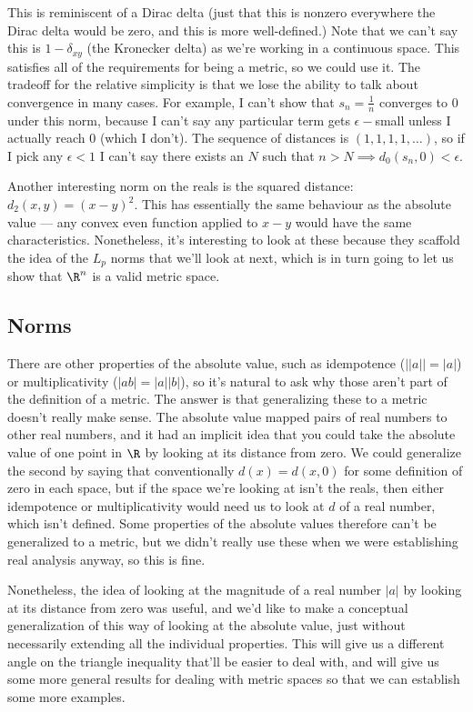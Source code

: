 \documentclass[./analysis.tex]{subfiles}
\begin{document}
    This is reminiscent of a Dirac delta (just that this is nonzero everywhere the Dirac delta would be zero, and this is more well-defined.) Note that we can't say this is $1 - \delta_{xy}$ (the Kronecker delta) as we're working in a continuous space. This satisfies all of the requirements for being a metric, so we could use it. The tradeoff for the relative simplicity is that we lose the ability to talk about convergence in many cases. For example, I can't show that $s_n = \frac{1}{n}$ converges to 0 under this norm, because I can't say any particular term gets $\epsilon-$small unless I actually reach 0 (which I don't). The sequence of distances is $(1, 1, 1, 1, \dots)$, so if I pick any $\epsilon < 1$ I can't say there exists an $N$ such that $n > N \implies d_0(s_n, 0) < \epsilon$.

    Another interesting norm on the reals is the squared distance: $d_2(x, y) = (x - y)^2$. This has essentially the same behaviour as the absolute value --- any convex even function applied to $x - y$ would have the same characteristics. Nonetheless, it's interesting to look at these because they scaffold the idea of the $L_p$ norms that we'll look at next, which is in turn going to let us show that $\R^n$ is a valid metric space.

    \subsection{Norms}

    There are other properties of the absolute value, such as idempotence ($||a|| = |a|$) or multiplicativity ($|ab| = |a||b|$), so it's natural to ask why those aren't part of the definition of a metric. The answer is that generalizing these to a metric doesn't really make sense. The absolute value mapped pairs of real numbers to other real numbers, and it had an implicit idea that you could take the absolute value of one point in $\R$ by looking at its distance from zero. We could generalize the second by saying that conventionally $d(x) = d(x, 0)$ for some definition of zero in each space, but if the space we're looking at isn't the reals, then either idempotence or multiplicativity would need us to look at $d$ of a real number, which isn't defined. Some properties of the absolute values therefore can't be generalized to a metric, but we didn't really use these when we were establishing real analysis anyway, so this is fine.

    Nonetheless, the idea of looking at the magnitude of a real number $|a|$ by looking at its distance from zero was useful, and we'd like to make a conceptual generalization of this way of looking at the absolute value, just without necessarily extending all the individual properties. This will give us a different angle on the triangle inequality that'll be easier to deal with, and will give us some more general results for dealing with metric spaces so that we can establish some more examples.
\end{document}
